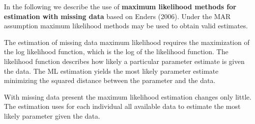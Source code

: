 In the following we describe the use of \textbf{maximum likelihood methods for estimation with missing data} based on Enders (2006). 
Under the MAR assumption maximum likelihood methods may be used to obtain valid estimates. \par
 The estimation of missing data maximum likelihood requires the maximization of the log likelihood function, which is the log of the likelihood function. The likelihood function describes how likely a particular parameter estimate is given the data. The ML estimation yields the most likely parameter estimate minimizing the squared distance between the parameter and the data. \par With missing data present the maximum likelihood estimation changes only little. The estimation uses for each individual all available data to estimate the most likely parameter given the data.


\endinput
